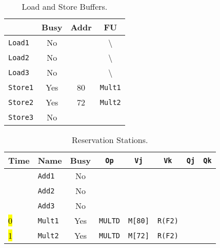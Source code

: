 \begin{enumerate}
    \begin{table}[!htp]
        \centering
        \begin{tabular}{@{} l | c c c @{}}
            \toprule
                                & Busy      & Addr      & FU   \\
            \midrule
            \texttt{Load1}      & No        &           & \textbackslash        \\ [.3em]
            \texttt{Load2}      & No        &           & \textbackslash        \\ [.3em]
            \texttt{Load3}      & No        &           & \textbackslash        \\
            \cmidrule{1-4}
            \texttt{Store1}     & Yes       & 80        & \texttt{Mult1}        \\ [.3em]
            \texttt{Store2}     & Yes       & 72        & \texttt{Mult2}        \\ [.3em]
            \texttt{Store3}     & No        &           &                       \\
            \bottomrule
        \end{tabular}
        \caption*{Load and Store Buffers.}
    \end{table}

    \begin{table}[!htp]
        \centering
        \begin{tabular}{@{} l l | c c c c c c @{}}
            \toprule
            Time        & Name              & Busy      & \texttt{Op}           & \texttt{Vj}           & \texttt{Vk}           & \texttt{Qj}           & \texttt{Qk}       \\
            \midrule
                        & \texttt{Add1}     & No        &                       &                       &                       &                       &                   \\ [.3em]
                        & \texttt{Add2}     & No        &                       &                       &                       &                       &                   \\ [.3em]
                        & \texttt{Add3}     & No        &                       &                       &                       &                       &                   \\ [.3em]
            \hl{0}      & \texttt{Mult1}    & Yes       & \texttt{MULTD}        & \texttt{M[80]}        & \texttt{R(F2)}        &                       &                   \\ [.3em]
            \hl{1}      & \texttt{Mult2}    & Yes       & \texttt{MULTD}        & \texttt{M[72]}        & \texttt{R(F2)}        &                       &                   \\
            \bottomrule
        \end{tabular}
        \caption*{Reservation Stations.}
    \end{table}


\end{enumerate}
